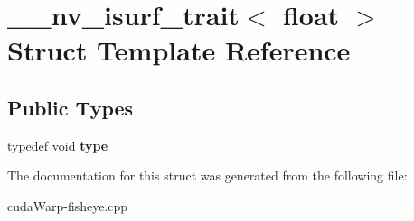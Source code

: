 \hypertarget{struct____nv__isurf__trait_3_01float_01_4}{}\section{\+\_\+\+\_\+nv\+\_\+isurf\+\_\+trait$<$ float $>$ Struct Template Reference}
\label{struct____nv__isurf__trait_3_01float_01_4}
\subsection*{Public Types}
\begin{DoxyCompactItemize}
\item 
typedef void {\bfseries type}\hypertarget{struct____nv__isurf__trait_3_01float_01_4_a0a4270683ee14656a07a27b1eef26db4}{}\label{struct____nv__isurf__trait_3_01float_01_4_a0a4270683ee14656a07a27b1eef26db4}

\end{DoxyCompactItemize}


The documentation for this struct was generated from the following file\+:\begin{DoxyCompactItemize}
\item 
cuda\+Warp-\/fisheye.\+cpp\end{DoxyCompactItemize}
